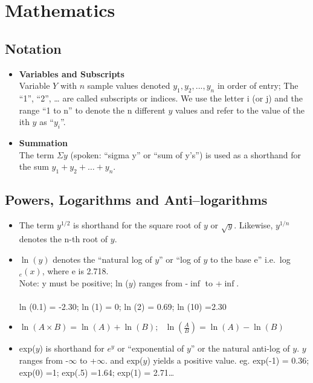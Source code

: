 \documentclass[]{book}
\begin{document}
\hypertarget{math}{%
\chapter{Mathematics}\label{math}}

\hypertarget{notation}{%
\section{Notation}\label{notation}}

\begin{itemize}
\item
  \textbf{Variables and Subscripts}\\
  Variable \(Y\) with \(n\) sample values denoted \(y_1, y_2, ..., y_n\) in order of entry; The ``1'', ``2'', \ldots{} are called subscripts or indices. We use the letter i (or j) and the range ``1 to n'' to denote the n different \(y\) values and refer to the value of the ith \(y\) as ``\(y_i\)''.
\item
  \textbf{Summation}\\
  The term \(\Sigma y\) (spoken: ``sigma y'' or ``sum of y's'') is used as a shorthand for the sum \(y_1 + y_2 + \dots + y_n\).
\end{itemize}

\hypertarget{powers-logarithms-and-antilogarithms}{%
\section{Powers, Logarithms and Anti--logarithms}\label{powers-logarithms-and-antilogarithms}}

\begin{itemize}
\item
  The term \(y^{1/2}\) is shorthand for the square root of \(y\) or \(\sqrt{y}\). Likewise, \(y^{1/n}\) denotes the n-th root of \(y\).
\item
  \(\ln (y)\) denotes the ``natural log of \(y\)'' or ``log of \(y\) to
  the base e'' i.e.~log\(_e(x)\), where e is 2.718.\\
  Note: y must be positive; ln (\(y\)) ranges from -\(\inf\) to +\(\inf\).\\
  \hspace*{0.333em}\\
  ln (0.1) = -2.30; ln (1) = 0; ln (2) = 0.69; ln (10) =2.30
\item
  \(\ln(A \times B) = \ln(A) + \ln(B); \ \ \ \ln(\frac{A}{B}) = \ln(A) - \ln(B)\)
\item
  exp(\(y\)) is shorthand for \(e^y\) or ``exponential of \(y\)'' or the natural anti-log of \(y\). \(y\) ranges from -\(\infty\) to +\(\infty\). and exp(\(y\)) yields a positive value. eg. exp(-1) = 0.36; exp(0) =1; exp(.5) =1.64; exp(1) = 2.71\ldots{}
\end{itemize}
\end{document}
